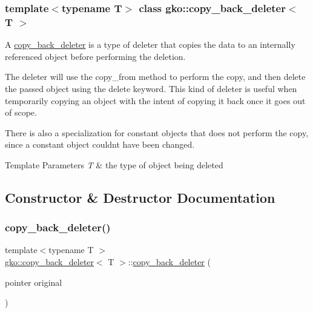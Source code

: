 \subsubsection*{template$<$typename T$>$\newline
class gko\+::copy\+\_\+back\+\_\+deleter$<$ T $>$}

A \hyperlink{classgko_1_1copy__back__deleter}{copy\+\_\+back\+\_\+deleter} is a type of deleter that copies the data to an internally referenced object before performing the deletion. 

The deleter will use the {\ttfamily copy\+\_\+from} method to perform the copy, and then delete the passed object using the {\ttfamily delete} keyword. This kind of deleter is useful when temporarily copying an object with the intent of copying it back once it goes out of scope.

There is also a specialization for constant objects that does not perform the copy, since a constant object couldn\textquotesingle{}t have been changed.


\begin{DoxyTemplParams}{Template Parameters}
{\em T} & the type of object being deleted \\
\hline
\end{DoxyTemplParams}


\subsection{Constructor \& Destructor Documentation}
\mbox{\label{classgko_1_1copy__back__deleter_affa618330dcb3a4e3aeaffb69c39df5f}} 
\subsubsection{\texorpdfstring{copy\+\_\+back\+\_\+deleter()}{copy\_back\_deleter()}}
{\footnotesize\ttfamily template$<$typename T $>$ \\
\hyperlink{classgko_1_1copy__back__deleter}{gko\+::copy\+\_\+back\+\_\+deleter}$<$ T $>$\+::\hyperlink{classgko_1_1copy__back__deleter}{copy\+\_\+back\+\_\+deleter} (\begin{DoxyParamCaption}\item[{pointer}]{original }\end{DoxyParamCaption})\hspace{0.3cm}{\ttfamily [inline]}}



